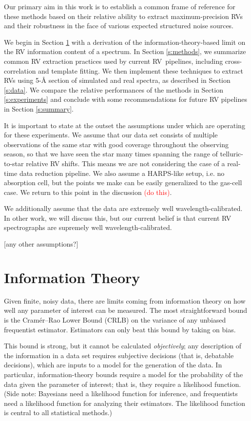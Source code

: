 \documentclass[modern]{aastex61}
\newcommand{\todo}[1]{\textcolor{red}{#1}}  %
\newcommand{\acronym}[1]{{\small{#1}}}
\newcommand{\RV}{\acronym{RV}}
\newcommand{\CRLB}{\acronym{CRLB}}
\begin{document}
Our primary aim in this work is to establish a common frame of reference for these methods based on their relative ability to extract maximum-precision RVs and their robustness in the face of various expected structured noise sources.

We begin in Section \ref{s:info} with a derivation of the information-theory-based limit on the RV information content of a spectrum. In Section \ref{s:methods}, we summarize common RV extraction practices used by current \RV\ pipelines, including cross-correlation and template fitting. We then implement these techniques to extract \RV s using 5-\r{A} section of simulated and real spectra, as described in Section \ref{s:data}. We compare the relative performances of the methods in Section \ref{s:experiments} and conclude with some recommendations for future RV pipelines in Section \ref{s:summary}. 

It is important to state at the outset the assumptions under which are operating for these experiments. We assume that our data set consists of multiple observations of the same star with good coverage throughout the observing season, so that we have seen the star many times spanning the range of telluric-to-star relative RV shifts. This means we are not considering the case of a real-time data reduction pipeline. We also assume a HARPS-like setup, i.e. no absorption cell, but the points we make can be easily generalized to the gas-cell case. We return to this point in the discussion \todo{(do this)}.

We additionally assume that the data are extremely well wavelength-calibrated. In other work, we will discuss this, but our current belief is that current RV spectrographs are supremely well wavelength-calibrated.

[any other assumptions?]

\section{Information Theory}
\label{s:info}

Given finite, noisy data, there are limits coming from information
theory on how well any parameter of interest can be measured.
The most straightforward bound is the Cram\'er--Rao Lower Bound (\CRLB) on the
variance of any unbiased frequentist estimator.
Estimators can only beat this bound by taking on bias.

This bound is strong, but it cannot be calculated \emph{objectively};
any description of the information in a data set requires
subjective decisions (that is, debatable decisions), which are inputs
to a model for the generation of the data.
In particular, information-theory bounds require a model for the
probability of the data given the parameter of interest; that is, they
require a likelihood function.
(Side note: Bayesians need a likelihood function for inference, and
frequentists need a likelihood function for analyzing their estimators.
The likelihood function is central to all statistical methods.)
\end{document}
